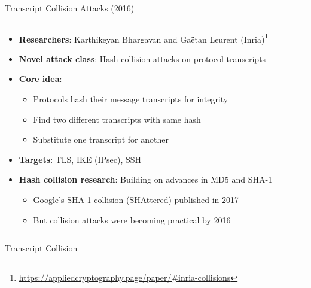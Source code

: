 \documentclass[aspectratio=169, lualatex, handout]{beamer}
\begin{document}
\begin{frame}{Transcript Collision Attacks (2016)}
	\begin{columns}[c]
		\begin{column}{1\textwidth}
			\begin{itemize}
				\item \textbf{Researchers}: Karthikeyan Bhargavan and Gaëtan Leurent (Inria)\footnote{\url{https://appliedcryptography.page/paper/\#inria-collisions}}
				\item \textbf{Novel attack class}: Hash collision attacks on protocol transcripts
				\item \textbf{Core idea}:
				      \begin{itemize}
					      \item Protocols hash their message transcripts for integrity
					      \item Find two different transcripts with same hash
					      \item Substitute one transcript for another
				      \end{itemize}
				\item \textbf{Targets}: TLS, IKE (IPsec), SSH
				\item \textbf{Hash collision research}: Building on advances in MD5 and SHA-1
				      \begin{itemize}
					      \item Google's SHA-1 collision (SHAttered) published in 2017
					      \item But collision attacks were becoming practical by 2016
				      \end{itemize}
			\end{itemize}
		\end{column}
	\end{columns}
\end{frame}

\begin{frame}{Transcript Collision}
\end{frame}
\end{document}
